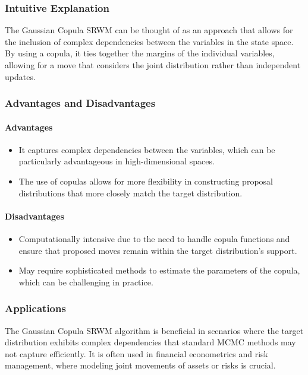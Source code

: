 \documentclass{article}
\begin{document}
\subsubsection{Intuitive Explanation}
The Gaussian Copula SRWM can be thought of as an approach that allows for the inclusion of complex dependencies between the variables in the state space. By using a copula, it ties together the margins of the individual variables, allowing for a move that considers the joint distribution rather than independent updates.

\subsubsection{Advantages and Disadvantages}
\paragraph{Advantages}
\begin{itemize}
    \item It captures complex dependencies between the variables, which can be particularly advantageous in high-dimensional spaces.
    \item The use of copulas allows for more flexibility in constructing proposal distributions that more closely match the target distribution.
\end{itemize}

\paragraph{Disadvantages}
\begin{itemize}
    \item Computationally intensive due to the need to handle copula functions and ensure that proposed moves remain within the target distribution's support.
    \item May require sophisticated methods to estimate the parameters of the copula, which can be challenging in practice.
\end{itemize}

\subsubsection{Applications}
The Gaussian Copula SRWM algorithm is beneficial in scenarios where the target distribution exhibits complex dependencies that standard MCMC methods may not capture efficiently. It is often used in financial econometrics and risk management, where modeling joint movements of assets or risks is crucial.

\printbibliography
\end{document}
